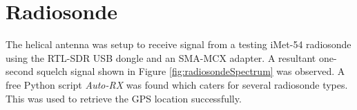 \graphicspath{{./figures}}

\section{Radiosonde}

The helical antenna was setup to receive signal from a testing iMet-54 radiosonde using the RTL-SDR USB dongle and an SMA-MCX adapter. A resultant one-second squelch signal shown in Figure \ref{fig:radiosondeSpectrum} was observed. A free Python script \textit{Auto-RX} \cite{site-autoRX} was found which caters for several radiosonde types. This was used to retrieve the GPS location successfully.
